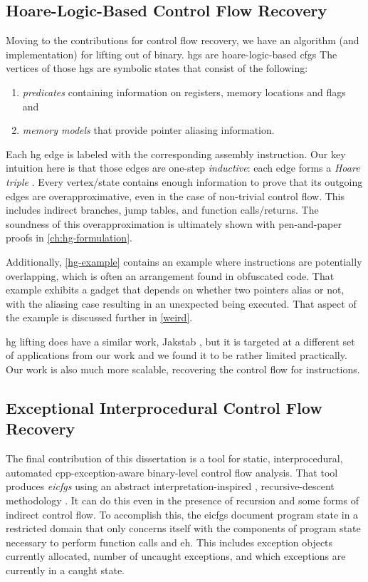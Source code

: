 \subsection{Hoare-Logic-Based Control Flow Recovery}
Moving to the contributions for control flow recovery, we have an algorithm (and implementation) for lifting  out of  binary.
\Acp{hg} are \gls{hoare-logic}-based \acp{cfg}
The vertices of those \acp{hg} are symbolic states that consist of the following:
\begin{enumerate}
  \item \emph{predicates} containing information on registers, memory locations and flags and
  \item \emph{memory models} that provide pointer aliasing information.
\end{enumerate}
Each \ac{hg} edge is labeled with the corresponding assembly instruction.
Our key intuition here is that those edges are one-step \emph{inductive}:
each edge forms a \emph{Hoare triple}
\autocite{hoare1969axiomatic}.
Every vertex/state contains enough information to prove that its outgoing edges are overapproximative,
even in the case of non-trivial control flow.
This includes indirect branches, jump tables, and function calls/returns.
The soundness of this overapproximation is ultimately shown with pen-and-paper proofs in \cref{ch:hg-formulation}.

Additionally, \cref{hg-example} contains an example where instructions are potentially overlapping, which is often an arrangement found in obfuscated code.
That example exhibits a  gadget that depends on whether two pointers alias or not, with the aliasing case resulting in an unexpected  being executed. That aspect of the example is discussed further in \cref{weird}.

\Ac{hg} lifting does have a similar work, Jakstab \autocite{kinder2010static,kinder2012alternating,kinder2012virtualization}, but it is targeted at a different set of applications from our work and we found it to be rather limited practically.
Our work is also much more scalable, recovering the control flow for  instructions.

\subsection{Exceptional Interprocedural Control Flow Recovery}
The final contribution of this dissertation is a tool for static, interprocedural, automated \gls{cpp}-exception-aware%
 
binary-level control flow analysis.
That tool produces \emph{\acp{eicfg}} using an abstract interpretation-inspired , recursive-descent methodology .
It can do this even in the presence of recursion and some forms of indirect control flow.
To accomplish this, the \acp{eicfg} document program state in a restricted domain that only concerns itself with the components of program state necessary to perform function calls and \ac{eh}.
This includes exception objects currently allocated, number of uncaught exceptions, and which exceptions are currently in a caught state.

